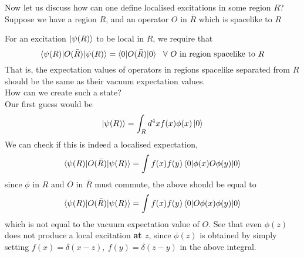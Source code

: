 \documentclass[11pt]{article}
\numberwithin{equation}{section}
\begin{document}
    Now let us discuss how can one define localised excitations in some region \(R\)?\\
    Suppose we have a region \(R\), and an operator \(O\) in \(\bar{R}\) which is spacelike to \(R\)
    \begin{figure}[h]
        \centering 
    \end{figure}

    For an excitation \(\ket{\psi(R)}\) to be local in \(R\), we require that 
    \begin{equation*}
        \braket{\psi(R)|O(\bar{R}) | \psi(R)} = \braket{0|O(\bar{R})|0} ~~\forall~O \text{ in region spacelike to }R
    \end{equation*} 
    That is, the expectation values of operators in regions spacelike separated from \(R\) should be the same as their vacuum expectation values.  \\

    How can we create such a state?\\
    Our first guess would be 
    \begin{equation*}
        \ket{\psi(R)} = \int_R d^4x f(x) \phi(x) \ket{0} 
    \end{equation*}
    We can check if this is indeed a localised expectation, 
    \begin{equation*}
        \braket{\psi(R)|O(\bar{R})|\psi(R)} = \int f(x) f(y) \braket{0|\phi(x) O \phi(y) | 0}
    \end{equation*}
    since \(\phi\) in \(R\) and \(O\) in \(\bar{R}\) must commute, the above should be equal to 
    \begin{equation*}
        \braket{\psi(R)|O(\bar{R})|\psi(R)} = \int f(x) f(y) \braket{0|O\phi(x)  \phi(y) | 0}
    \end{equation*}
    which is not equal to the vacuum expectation value of \(O\). See that even \(\phi(z)\) does not produce a local excitation \textbf{at \(z\)}, since \(\phi(z)\) is obtained by simply setting \(f(x) = \delta(x-z), ~f(y) = \delta(z-y)\) in the above integral.  \\
\end{document}
